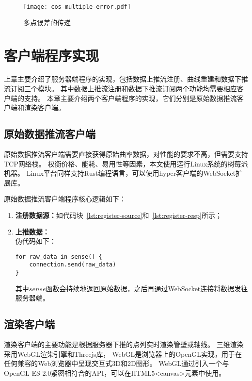 \begin{figure}[H]
\centering
\texttt{[image: cos-multiple-error.pdf]}
\caption{多点误差的传递}
\label{fig:cos-multiple-error}
\end{figure}

\cleardoublepage

\section{客户端程序实现}
上章主要介绍了服务器端程序的实现，包括数据上推流注册、曲线重建和数据下推流订阅三个模块。
其中数据上推流注册和数据下推流订阅两个功能均需要相应客户端的支持。
本章主要介绍两个客户端程序的实现，它们分别是原始数据推流客户端和渲染客户端。

\subsection{原始数据推流客户端}
原始数据推流客户端需要直接获得原始曲率数据，对性能的要求不高，但需要支持TCP网络栈。
权衡价格、能耗、易用性等因素，本文使用运行Linux系统的树莓派机器。
Linux平台同样支持Rust编程语言，可以使用hyper客户端的WebSocket扩展库。

原始数据推流客户端程序核心逻辑如下：

\begin{enumerate}
\item \textbf{注册数据源：}如代码块~\ref{lst:register-source}和~\ref{lst:register-resp}所示；
\item \textbf{上推数据：} \\
伪代码如下：

\begin{lstlisting}[caption={上推数据}]
for raw_data in sense() {
    connection.send(raw_data)
}
\end{lstlisting}

其中$sense$函数会持续地返回原始数据，之后再通过WebSocket连接将数据发往服务器端。

\end{enumerate}

\subsection{渲染客户端}

渲染客户端的主要功能是根据服务器下推的点列实时渲染管壁或轴线。
三维渲染采用WebGL渲染引擎和Threejs库，
WebGL是浏览器上的OpenGL实现，用于在任何兼容的Web浏览器中呈现交互式3D和2D图形\cite{webgl}。
WebGL通过引入一个与OpenGL ES 2.0紧密相符合的API，可以在HTML5<canvas>元素中使用。

